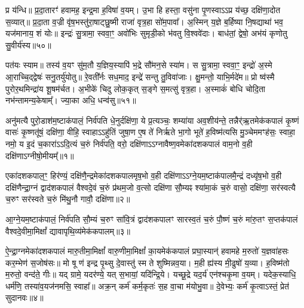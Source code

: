 प्र य॑न्धि॥ प्र॒दा॒तारꣳ॑ हवामह॒ इन्द्र॒मा ह॒विषा॑ व॒यम्। उ॒भा हि हस्ता॒ वसु॑ना पृ॒णस्वा\-ऽ\-ऽप्र य॑च्छ॒ दक्षि॑णा॒दोत स॒व्यात्॥ प्र॒दा॒ता व॒ज्री वृ॑ष॒भस्तु॑रा॒षाट्छु॒ष्मी राजा॑ वृत्र॒हा सो॑म॒पावा᳚। अ॒स्मिन् य॒ज्ञे ब॒र्\mbox{}हिष्या नि॒षद्याथा॑ भव॒ यज॑मानाय॒ शं योः॥ इन्द्रः॑ सु॒त्रामा॒ स्ववा॒ꣳ॒ अवो॑भिः सुमृडी॒को भ॑वतु वि॒श्ववे॑दाः। बाध॑तां॒ द्वेषो॒ अभ॑यं कृणोतु सु॒वीर्य॑स्य॥५०॥

पत॑यः स्याम॥ तस्य॑ व॒यꣳ सु॑म॒तौ य॒ज्ञिय॒स्यापि॑ भ॒द्रे सौ॑मन॒से स्या॑म। स सु॒त्रामा॒ स्ववा॒ꣳ॒ इन्द्रो॑ अ॒स्मे आ॒राच्चि॒द्द्वेषः॑ सनु॒तर्यु॑योतु॥ रे॒वती᳚र्नः सध॒माद॒ इन्द्रे॑ सन्तु तु॒विवा॑जाः। क्षु॒मन्तो॒ याभि॒र्मदे॑म॥ प्रो ष्व॑स्मै पुरोर॒थमिन्द्रा॑य शू॒षम॑र्चत। अ॒भीके॑ चिदु लोक॒कृत् स॒ङ्गे स॒मत्सु॑ वृत्र॒हा। अ॒स्माकं॑ बोधि चोदि॒ता नभ॑न्तामन्य॒केषाम्᳚। ज्या॒का अधि॒ धन्व॑सु॥५१॥

{\anuvakamend[{ज॒रसा॒ मा ते॑ हर्यश्व सु॒वीर्य॒स्याध्येकं॑ च॥13॥}]}

\setcounter{anuvakam}{0}
अनु॑मत्यै पुरो॒डाश॑म॒ष्टाक॑पालं॒ निर्व॑पति धे॒नुर्दक्षि॑णा॒ ये प्र॒त्यञ्चः॒ शम्या॑या अव॒शीय॑न्ते॒ तन्नैर्॑ऋ॒तमेक॑कपालं कृ॒ष्णं वासः॑ कृ॒ष्णतू॑षं॒ दक्षि॑णा॒ वीहि॒ स्वाहा\-ऽ\-ऽहु॑तिं जुषा॒ण ए॒ष ते॑ निर्\mbox{}ऋते भा॒गो भूते॑ ह॒विष्म॑त्यसि मु॒ञ्चेममꣳह॑सः॒ स्वाहा॒ नमो॒ य इ॒दं च॒कारा॑\-ऽ\-ऽदि॒त्यं च॒रुं निर्व॑पति॒ वरो॒ दक्षि॑णा\-ऽ\-ऽग्नावैष्ण॒वमेका॑दशकपालं वाम॒नो व॒ही दक्षि॑णा\-ऽग्नीषो॒मीयम्᳚॥१॥

एका॑दशकपाल॒ꣳ॒ हिर॑ण्यं॒ दक्षि॑णै॒न्द्रमेका॑दशकपालमृष॒भो व॒ही दक्षि॑णा\-ऽ\-ऽग्ने॒यम॒ष्टाक॑पालमै॒न्द्रं दध्यृ॑ष॒भो व॒ही दक्षि॑णैन्द्रा॒ग्नं द्वाद॑शकपालं वैश्वदे॒वं च॒रुं प्र॑थम॒जो व॒त्सो दक्षि॑णा सौ॒म्यꣴ श्या॑मा॒कं च॒रुं वासो॒ दक्षि॑णा॒ सर॑स्वत्यै च॒रुꣳ सर॑स्वते च॒रुं मि॑थु॒नौ गावौ॒ दक्षि॑णा॥२॥

{\anuvakamend[{अ॒ग्नी॒षो॒मीयं॒ चतु॑स्त्रिꣳशच्च॥१॥}]}

आ॒ग्ने॒यम॒ष्टाक॑पालं॒ निर्व॑पति सौ॒म्यं च॒रुꣳ सा॑वि॒त्रं द्वाद॑शकपालꣳ सारस्व॒तं च॒रुं पौ॒ष्णं च॒रुं मा॑रु॒तꣳ स॒प्तक॑पालं वैश्वदे॒वीमा॒मिक्षां᳚ द्यावापृथि॒व्य॑मेक॑कपालम्॥३॥

{\anuvakamend[{आ॒ग्ने॒यम॒ष्टाद॑श॥२॥}]}

ऐ॒न्द्रा॒ग्नमेका॑दशकपालं मारु॒तीमा॒मिक्षां᳚ वारु॒णीमा॒मिक्षां᳚ का॒यमेक॑कपालं प्रघा॒स्यान्॑ हवामहे म॒रुतो॑ य॒ज्ञवा॑हसः कर॒म्भेण॑ स॒जोष॑सः॥ मो षू ण॑ इन्द्र पृ॒थ्सु दे॒वास्तु॑ स्म ते शुष्मिन्नव॒या। म॒ही ह्य॑स्य मी॒ढुषो॑ य॒व्या। ह॒विष्म॑तो म॒रुतो॒ वन्द॑ते॒ गीः॥ यद् ग्रामे॒ यदर॑ण्ये॒ यत् स॒भायां॒ यदि॑न्द्रि॒ये। यच्छू॒द्रे यद॒र्य॑ एन॑श्चकृ॒मा व॒यम्। यदेक॒स्याधि॒ धर्म॑णि॒ तस्या॑व॒यज॑नमसि॒ स्वाहा᳚॥ अक्र॒न् कर्म॑ कर्म॒कृतः॑ स॒ह वा॒चा म॑योभु॒वा॥ दे॒वेभ्यः॒ कर्म॑ कृ॒त्वा\-ऽस्तं॒ प्रेत॑ सुदानवः॥४॥


